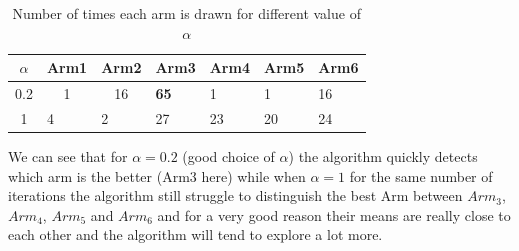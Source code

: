 \documentclass[11pt]{article}
\numberwithin{figure}{section} %
\begin{document}
\begin{table}[h]
\centering
\begin{tabular}{|c|c|c|l|l|l|l|}
\hline
\textbf{$\alpha$} & \textbf{Arm1} & \textbf{Arm2} & \textbf{Arm3} & \textbf{Arm4} & \textbf{Arm5} & \textbf{Arm6} \\ \hline
0.2 & 1 & 16 & \textbf{65} & 1 & 1 & 16 \\ \hline
1 & \multicolumn{1}{l|}{4} & \multicolumn{1}{l|}{2} & 27 & 23 & 20 & 24 \\ \hline
\end{tabular}
\caption{Number of times each arm is drawn for different value of $\alpha$}
\label{table:nb_drawn}
\end{table}

We can see that for $\alpha = 0.2$ (good choice of $\alpha$) the algorithm quickly detects which arm is the better (Arm3 here) while when $\alpha = 1$ for the same number of iterations the algorithm still struggle to distinguish the best Arm between $Arm_3$, $Arm_4$, $Arm_5$ and $Arm_6$ and for a very good reason their means are really close to each other and the algorithm will tend to explore a lot more.
\end{document}
